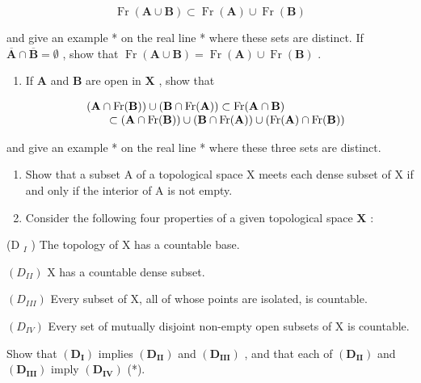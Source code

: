 \[
\operatorname{Fr} (\mathbf {A} \cup \mathbf {B}) \subset \operatorname{Fr} (\mathbf {A}) \cup \operatorname{Fr} (\mathbf {B})
\]

and give an example * on the real line * where these sets are distinct. If \(\overline{\mathbf{A}} \cap \overline{\mathbf{B}} = \emptyset\) , show that \(\operatorname{Fr}(\mathbf{A} \cup \mathbf{B}) = \operatorname{Fr}(\mathbf{A}) \cup \operatorname{Fr}(\mathbf{B})\) .

\begin{enumerate}
\def\labelenumi{\alph{enumi})}
\setcounter{enumi}{2}
\tightlist
\item
  If \(\mathbf{A}\) and \(\mathbf{B}\) are open in \(\mathbf{X}\) , show that
\end{enumerate}

\[
\begin{array}{r l} & (\mathbf {A} \cap \operatorname{Fr} (\mathbf {B})) \cup (\mathbf {B} \cap \operatorname{Fr} (\mathbf {A})) \subset \operatorname{Fr} (\mathbf {A} \cap \mathbf {B}) \\ & \qquad \subset (\mathbf {A} \cap \operatorname{Fr} (\mathbf {B})) \cup (\mathbf {B} \cap \operatorname{Fr} (\mathbf {A})) \cup (\operatorname{Fr} (\mathbf {A}) \cap \operatorname{Fr} (\mathbf {B})) \end{array}
\]

and give an example * on the real line * where these three sets are distinct.

\begin{enumerate}
\def\labelenumi{\arabic{enumi})}
\setcounter{enumi}{5}
\item
  Show that a subset A of a topological space X meets each dense subset of X if and only if the interior of A is not empty.
\item
  Consider the following four properties of a given topological space \(\mathbf{X}\) :
\end{enumerate}

(D \(_{I}\) ) The topology of X has a countable base.

\((D_{II})\) X has a countable dense subset.

\((D_{III})\) Every subset of X, all of whose points are isolated, is countable.

\((D_{IV})\) Every set of mutually disjoint non-empty open subsets of X is countable.

Show that \((\mathbf{D}_{\mathbf{I}})\) implies \((\mathbf{D}_{\mathbf{II}})\) and \((\mathbf{D}_{\mathbf{III}})\) , and that each of \((\mathbf{D}_{\mathbf{II}})\) and \((\mathbf{D}_{\mathbf{III}})\) imply \((\mathbf{D}_{\mathbf{IV}})\) (*).

